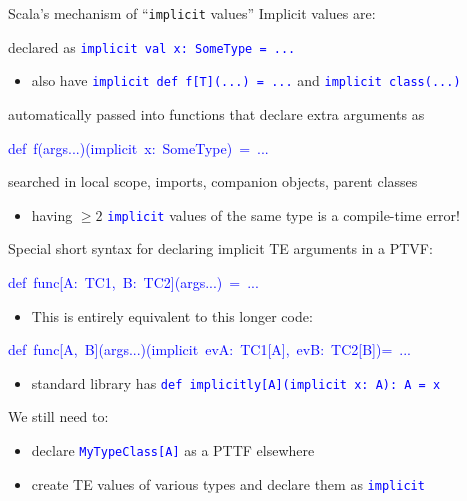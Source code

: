 \documentclass[english]{beamer}
\newenvironment{lyxcode}
   {\par\begin{list}{}{
     \setlength{\rightmargin}{\leftmargin}
     \setlength{\listparindent}{0pt}%
     \raggedright
     \setlength{\itemsep}{0pt}
     \setlength{\parsep}{0pt}
     \normalfont\ttfamily}%
    \def\{{\char`\{}
    \def\}{\char`\}}
    \def\textasciitilde{\char`\~}
    \item[]}
   {\end{list}}
\begin{document}
\begin{frame}{Scala's mechanism of ``\texttt{implicit} values''}
Implicit values are:
\begin{itemize}
\item declared as \texttt{\textcolor{blue}{\footnotesize{}implicit val x:\ SomeType
= ...}}{\footnotesize \par}
\begin{itemize}
\item also have \texttt{\textcolor{blue}{\footnotesize{}implicit def f{[}T{]}(...)\ =
...}} and \texttt{\textcolor{blue}{\footnotesize{}implicit class(...)}}{\footnotesize \par}
\end{itemize}
\item automatically passed into functions that declare extra arguments as
\begin{lyxcode}
\textcolor{blue}{\footnotesize{}def~f(args...)(implicit~x:~SomeType)~=~...}{\footnotesize \par}
\end{lyxcode}
\item searched in local scope, imports, companion objects, parent classes
\begin{itemize}
\item having $\geq2$ \texttt{\textcolor{blue}{\footnotesize{}implicit}}
values of the same type is a compile-time error!
\end{itemize}
\end{itemize}
Special short syntax for declaring implicit TE arguments in a PTVF:
\begin{lyxcode}
\textcolor{blue}{\footnotesize{}def~func{[}A:~TC1,~B:~TC2{]}(args...)~=~...}{\footnotesize \par}
\end{lyxcode}
\begin{itemize}
\item This is entirely equivalent to this longer code:
\end{itemize}
\begin{lyxcode}
\textcolor{blue}{\footnotesize{}def~func{[}A,~B{]}(args...)(implicit~evA:~TC1{[}A{]},~evB:~TC2{[}B{]})=~...}{\footnotesize \par}
\end{lyxcode}
\begin{itemize}
\item standard library has \texttt{\textcolor{blue}{\footnotesize{}def implicitly{[}A{]}(implicit
x:\ A):\ A = x}}{\footnotesize \par}
\end{itemize}
We still need to:
\begin{itemize}
\item declare \texttt{\textcolor{blue}{\footnotesize{}MyTypeClass{[}A{]}}}
as a PTTF elsewhere
\item create TE values of various types and declare them as \texttt{\textcolor{blue}{\footnotesize{}implicit}}
\ 
\end{itemize}
\end{frame}
\end{document}
